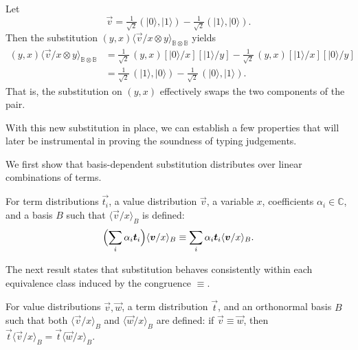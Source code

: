 \documentclass[runningheads,orivec,envcountsame,envcountsect]{llncs}
\newcommand\ket[1]{\ensuremath{|#1\rangle}}
\newcommand\ansubst[2]{\ensuremath{\langle #1 \rangle_{#2}}}
\def\C{\mathbb{C}}            %
\def\Pair#1#2{(#1,#2)} %
\newcommand\B{\mathbb B}
\begin{document}
\begin{example}
  Let
  \[
    \vec v = \tfrac{1}{\sqrt{2}}\Pair{\ket{0}}{\ket{1}}
             - \tfrac{1}{\sqrt{2}}\Pair{\ket{1}}{\ket{0}}.
  \]
  Then the substitution $(y,x)\ansubst{\vec v/x\otimes y}{\B\otimes\B}$ yields
  \begin{align*}
    (y,x)\ansubst{\vec v/x\otimes y}{\B\otimes\B}
    &= \tfrac{1}{\sqrt{2}}\,(y,x)[\ket{0}/x][\ket{1}/y]
       - \tfrac{1}{\sqrt{2}}\,(y,x)[\ket{1}/x][\ket{0}/y] \\
    &= \tfrac{1}{\sqrt{2}}\,(\ket{1},\ket{0})
       - \tfrac{1}{\sqrt{2}}\,(\ket{0},\ket{1}).
  \end{align*}
  That is, the substitution on $(y,x)$ effectively swaps the two components of the pair.
\end{example}

With this new substitution in place, we can establish a few properties that
will later be instrumental in proving the soundness of typing judgements.

We first show that basis-dependent substitution distributes over linear
combinations of terms.

\begin{lemma}\label{lem:distributiveSubstitution}
  For term distributions $\vec{t_i}$, a value distribution $\vec{v}$, a
  variable $x$, coefficients $\alpha_i\in\C$, and a basis $B$ such that
  $\ansubst{\vec v/x}{B}$ is defined:
  \[
    \Bigl(\sum_i \alpha_i\vec t_i\Bigr)\ansubst{\vec v/x}{B}
    \equiv
    \sum_i \alpha_i\vec t_i \ansubst{\vec v/x}{B}.
  \]
\end{lemma}

The next result states that substitution behaves consistently within each
equivalence class induced by the congruence $\equiv$.

\begin{lemma}\label{lem:EquivSubstitutions}
  For value distributions $\vec{v},\vec{w}$, a term distribution $\vec{t}$, and
  an orthonormal basis $B$ such that both
  $\ansubst{\vec{v}/x}{B}$ and $\ansubst{\vec{w}/x}{B}$ are defined:
  if $\vec{v}\equiv\vec{w}$, then
  $\vec{t}\ansubst{\vec{v}/x}{B}
  =\vec{t}\ansubst{\vec{w}/x}{B}$.
\end{lemma}
\end{document}
